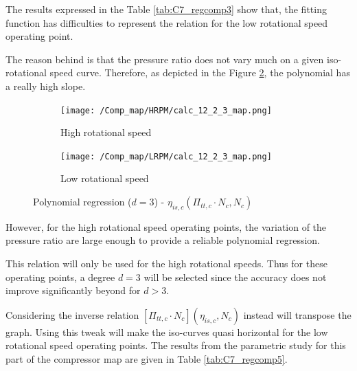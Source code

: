 The results expressed in the Table \ref{tab:C7_regcomp3} show that, the fitting function has difficulties to represent the relation for the low rotational speed operating point. 

The reason behind is that the pressure ratio does not vary much on a given iso-rotational speed curve. Therefore, as depicted in the Figure \ref{fig:C7_polycomp_eta1_LRPM}, the polynomial has a really high slope.  

\begin{figure}[H]
    \centering
    \begin{subfigure}[b]{0.4\textwidth}
        \centering
        \texttt{[image: /Comp\_map/HRPM/calc\_12\_2\_3\_map.png]}
        \caption{High rotational speed}
        \label{fig:C7_polycomp_eta1_HRPM}
    \end{subfigure}
    \begin{subfigure}[b]{0.4\textwidth}
        \centering
        \texttt{[image: /Comp\_map/LRPM/calc\_12\_2\_3\_map.png]}
        \caption{Low rotational speed}
        \label{fig:C7_polycomp_eta1_LRPM}
    \end{subfigure}
    \caption{Polynomial regression ($d=3$) - $\eta_{is,c}(\Pi_{tt,c}\cdot N_c,N_c)$} \label{fig:C7_polycomp_eta1}
\end{figure}

However, for the high rotational speed operating points, the variation of the pressure ratio are large enough to provide a reliable polynomial regression. 

This relation will only be used for the high rotational speeds. Thus for these operating points, a degree $d=3$ will be selected since the accuracy does not improve significantly beyond for $d>3$.

Considering the inverse relation $[\Pi_{tt,c}\cdot N_c](\eta_{is,c},N_c)$ instead will transpose the graph. Using this tweak will make the iso-curves quasi horizontal for the low rotational speed operating points. The results from the parametric study for this part of the compressor map are given in Table \ref{tab:C7_regcomp5}. 

